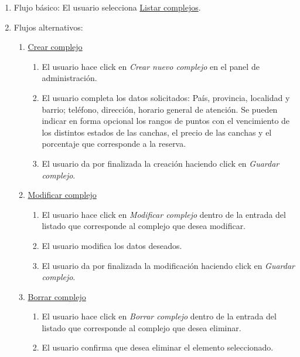 \documentclass[a4paper,11pt]{article}
\begin{document}
\begin{enumerate}
\begin{enumerate}
        \item Flujo básico:
            El usuario selecciona \underline{Listar complejos}.
        \item Flujos alternativos:\\
            \begin{enumerate}
                \item \underline{Crear complejo} \\
                \begin{enumerate}
                    \item El usuario hace click en \textit{Crear nuevo complejo}
                    en el panel de administración.
                    \item El usuario completa los datos solicitados: País, 
                    provincia, localidad y barrio; teléfono, dirección, horario 
                    general de atención.
                    Se pueden indicar en forma opcional los rangos de puntos con
                    el vencimiento de los distintos estados de las canchas, el 
                    precio de las canchas y el porcentaje que corresponde a la
                    reserva.
                    \item El usuario da por finalizada la creación haciendo click
                    en \textit{Guardar complejo}.
                \end{enumerate}
                \item \underline{Modificar complejo} \\
                \begin{enumerate}
                    \item El usuario hace click en \textit{Modificar complejo} 
                    dentro de la entrada del listado que corresponde al complejo 
                    que desea modificar.
                    \item El usuario modifica los datos deseados.
                    \item El usuario da por finalizada la modificación haciendo 
                    click en \textit{Guardar complejo}.
                \end{enumerate}
                \item \underline{Borrar complejo}
                \begin{enumerate}
                    \item El usuario hace click en \textit{Borrar complejo}
                    dentro de la entrada del listado que corresponde al complejo
                     que desea eliminar.
                    \item El usuario confirma que desea eliminar el elemento
                    seleccionado.
                \end{enumerate}
            \end{enumerate}
    \end{enumerate}


\end{enumerate}
\end{document}

